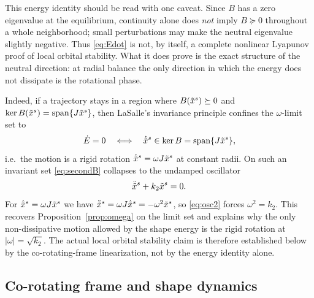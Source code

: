 This energy identity should be read with one caveat. Since $B$ has a zero eigenvalue at the
equilibrium, continuity alone does \emph{not} imply $B\succeq0$ throughout a whole neighborhood;
small perturbations may make the neutral eigenvalue slightly negative. Thus \eqref{eq:Edot} is not,
by itself, a complete nonlinear Lyapunov proof of local orbital stability. What it does prove is the
exact structure of the neutral direction: at radial balance the only direction in which the energy
does not dissipate is the rotational phase.

Indeed, if a trajectory stays in a region where $B(\tilde{x}^s)\succeq0$ and
$\ker B(\tilde{x}^s)=\operatorname{span}\{J\tilde{x}^s\}$, then LaSalle's invariance principle confines the
$\omega$-limit set to
\begin{equation}
  \dot E=0\quad\Longleftrightarrow\quad
  \dot{\tilde{x}}^s\in\ker B=\operatorname{span}\{J\tilde{x}^s\},
  \label{eq:Edot0}
\end{equation}
i.e.\ the motion is a rigid rotation $\dot{\tilde{x}}^s=\omega J\tilde{x}^s$ at constant radii. On such an
invariant set \eqref{eq:secondB} collapses to the undamped oscillator
\begin{equation}
  \ddot{\tilde{x}}^s+k_2\tilde{x}^s=0 .
  \label{eq:osc2}
\end{equation}
For $\dot{\tilde{x}}^s=\omega J\tilde{x}^s$ we have $\ddot{\tilde{x}}^s=\omega J\dot{\tilde{x}}^s=-\omega^2\tilde{x}^s$, so
\eqref{eq:osc2} forces $\omega^2=k_2$. This recovers Proposition~\ref{prop:omega} on the limit set
and explains why the only non-dissipative motion allowed by the shape energy is the rigid rotation
at $|\omega|=\sqrt{k_2}$. The actual local orbital stability claim is therefore established below
by the co-rotating-frame linearization, not by the energy identity alone.

\subsection{Co-rotating frame and shape dynamics}
\label{sec:shape}

